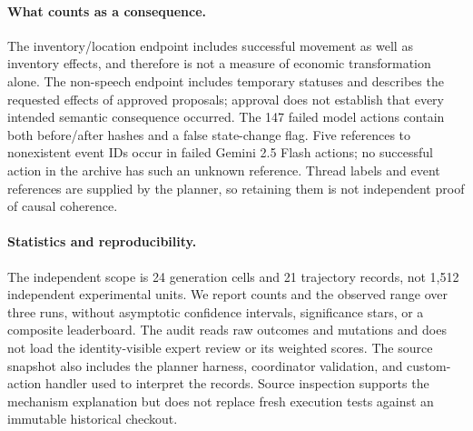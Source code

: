 \paragraph{What counts as a consequence.}
The inventory/location endpoint includes successful movement as well as
inventory effects, and therefore is not a measure of economic transformation
alone. The non-speech endpoint includes temporary statuses and describes the
requested effects of approved proposals; approval does not establish that
every intended semantic consequence occurred. The 147 failed model actions
contain both before/after hashes and a false state-change flag. Five references
to nonexistent event IDs occur in failed Gemini 2.5 Flash actions; no successful
action in the archive has such an unknown reference. Thread labels and event
references are supplied by the planner, so retaining them is not independent
proof of causal coherence.

\paragraph{Statistics and reproducibility.}
The independent scope is 24 generation cells and 21 trajectory records, not
1,512 independent experimental units. We report counts and the observed range
over three runs, without asymptotic confidence intervals, significance stars,
or a composite leaderboard. The audit reads raw outcomes and mutations and
does not load the identity-visible expert review or its weighted scores.
The source snapshot also includes the planner harness, coordinator validation,
and custom-action handler used to interpret the records. Source inspection
supports the mechanism explanation but does not replace fresh execution tests
against an immutable historical checkout.
